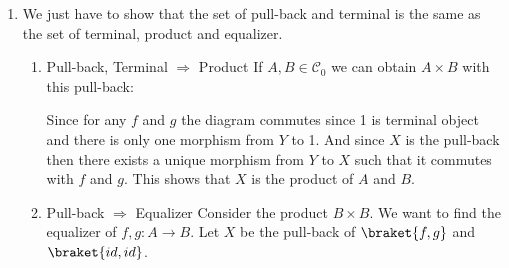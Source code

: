 \begin{enumerate}[label=]
    \item 
        We just have to show that the set of pull-back and terminal is the same as the set of terminal, product and equalizer.
        \begin{enumerate}[label=(\textit{\roman*})]
            \item 
                Pull-back, Terminal $\Rightarrow$ Product \newline
                If $A, B \in \mathcal C_0$ we can obtain $A \times B$ with this pull-back:
                \begin{center}
                \end{center}
                Since for any $f$ and $g$ the diagram commutes since 1 is terminal object and there is only one morphism from $Y$ to 1. And since $X$ is the pull-back then there exists a unique morphism from $Y$ to $X$ such that it commutes with $f$ and $g$.
                This shows that $X$ is the product of $A$ and $B$.
            \item 
                Pull-back $\Rightarrow$ Equalizer \newline
                Consider the product $B\times B$. We want to find the equalizer of $f, g: A \to B$.
                Let $X$ be the pull-back of $\braket{f, g}$ and $\braket{id, id}$.
                \begin{center}
\end{center}
\end{enumerate}
\end{enumerate}
